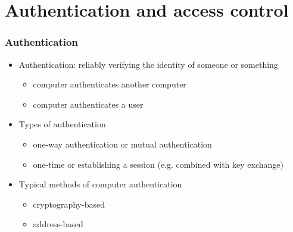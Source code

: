 \documentclass[final]{article}
\begin{document}
\section{Authentication and access control}
\subsubsection*{Authentication}
\begin{itemize}[nosep]
    \item Authentication: reliably verifying the identity of someone or something
          \begin{itemize}[nosep]
              \item computer authenticates another computer
              \item computer authenticates a user
          \end{itemize}
    \item Types of authentication
          \begin{itemize}[nosep]
              \item one-way authentication or mutual authentication
              \item one-time or establishing a session (e.g. combined with key exchange)
          \end{itemize}
    \item Typical methods of computer authentication
          \begin{itemize}[nosep]
              \item cryptography-based
              \item address-based
          \end{itemize}
\end{itemize}
\end{document}
